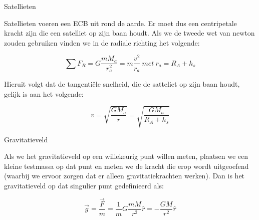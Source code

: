\begin{app}[Satellieten]{Satellieten}

    Satellieten voeren een ECB uit rond de aarde. Er moet dus een centripetale kracht zijn die een satelliet op zijn baan houdt. Als we de tweede wet van newton zouden gebruiken vinden we in de radiale richting het volgende: 
    
    \begin{equation*}
        \sum F_R = G\dfrac{mM_a}{r_a^2} = m \dfrac{v^2}{r_a} \ met \ r_a = R_A + h_s
    \end{equation*}
    
    
    \noindent Hieruit volgt dat de tangentiêle snelheid, die de satteliet op zijn baan houdt, gelijk is aan het volgende:
    
    \begin{equation*}
        v = \sqrt{\dfrac{GM_a}{r}} = \sqrt{\dfrac{GM_a}{R_A + h_s}}
    \end{equation*}
    

\end{app}

\begin{theo}[Gravitatieveld]{Gravitatieveld}
    
    
    Als we het gravitatieveld op een willekeurig punt willen meten, plaatsen we een kleine testmassa op dat punt en meten we de kracht die erop wordt uitgeoefend (waarbij we ervoor zorgen dat er alleen gravitatiekrachten werken). Dan is het gravitatieveld op dat singulier punt gedefinieerd als: 
    
    \begin{equation*}
        \Vec{g} = \dfrac{\Vec{F}}{m} = \dfrac{1}{m}G\dfrac{mM}{r^2}\hat{r} = -\dfrac{GM}{r^2}\hat{r} 
    \end{equation*}

\end{theo}


    
